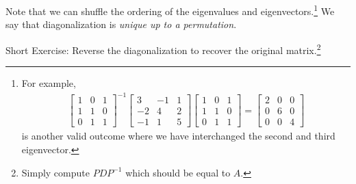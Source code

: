 \begin{solution}
Note that we can shuffle the ordering of the eigenvalues and eigenvectors.\footnote{For example, \begin{align*}
\begin{bmatrix}
1 & 0 & 1 \\
1 & 1 & 0 \\
0 & 1 & 1 
\end{bmatrix}^{-1}
\begin{bmatrix}
3 & -1 & 1 \\
-2 & 4 & 2 \\
-1 & 1 & 5
\end{bmatrix}
\begin{bmatrix}
1 & 0 & 1 \\
1 & 1 & 0 \\
0 & 1 & 1 
\end{bmatrix}
=
\begin{bmatrix}
2 & 0 & 0 \\
0 & 6 & 0 \\
0 & 0 & 4
\end{bmatrix}
\end{align*} is another valid outcome where we have interchanged the second and third eigenvector.} We say that diagonalization is \textit{unique up to a permutation}.
\end{solution}
Short Exercise: Reverse the diagonalization to recover the original matrix.\footnote{Simply compute $PDP^{-1}$ which should be equal to $A$.}

